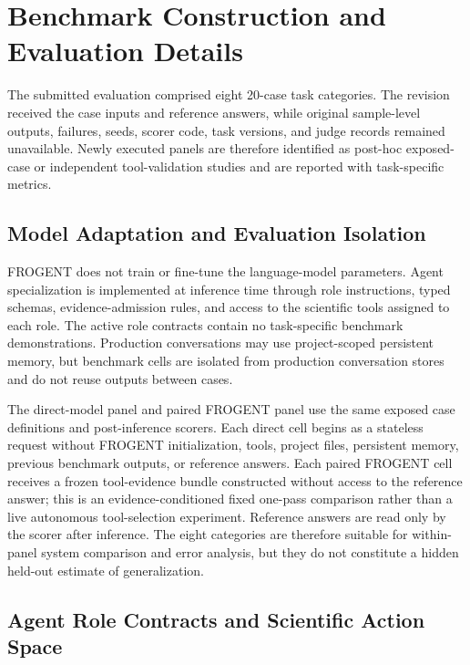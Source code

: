 \documentclass{article}
\begin{document}
\maketitle

\beginsupplement

\section{Benchmark Construction and Evaluation Details}\label{secA1}

The submitted evaluation comprised eight 20-case task categories. The revision received the case inputs and reference answers, while original sample-level outputs, failures, seeds, scorer code, task versions, and judge records remained unavailable. Newly executed panels are therefore identified as post-hoc exposed-case or independent tool-validation studies and are reported with task-specific metrics.

\subsection{Model Adaptation and Evaluation Isolation}

FROGENT does not train or fine-tune the language-model parameters. Agent specialization is implemented at inference time through role instructions, typed schemas, evidence-admission rules, and access to the scientific tools assigned to each role. The active role contracts contain no task-specific benchmark demonstrations. Production conversations may use project-scoped persistent memory, but benchmark cells are isolated from production conversation stores and do not reuse outputs between cases.

The direct-model panel and paired FROGENT panel use the same exposed case definitions and post-inference scorers. Each direct cell begins as a stateless request without FROGENT initialization, tools, project files, persistent memory, previous benchmark outputs, or reference answers. Each paired FROGENT cell receives a frozen tool-evidence bundle constructed without access to the reference answer; this is an evidence-conditioned fixed one-pass comparison rather than a live autonomous tool-selection experiment. Reference answers are read only by the scorer after inference. The eight categories are therefore suitable for within-panel system comparison and error analysis, but they do not constitute a hidden held-out estimate of generalization.

\subsection{Agent Role Contracts and Scientific Action Space}
\end{document}
